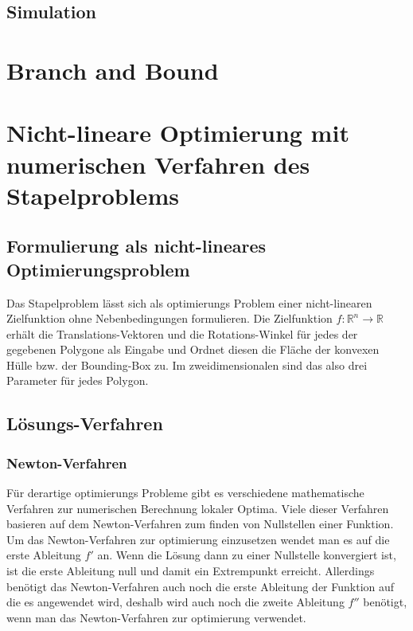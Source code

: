 \documentclass[runningheads,a4paper]{llncs}
\begin{document}
\subsection{Simulation}

\section{Branch and Bound}

\section{Nicht-lineare Optimierung mit numerischen Verfahren des Stapelproblems}

\subsection{Formulierung als nicht-lineares Optimierungsproblem}
\label{formObjStacking}
Das Stapelproblem lässt sich als optimierungs Problem einer nicht-linearen Zielfunktion ohne Nebenbedingungen formulieren. Die Zielfunktion $f: \mathbb{R}^n \rightarrow \mathbb{R}$ erhält die Translations-Vektoren und die Rotations-Winkel für jedes der gegebenen Polygone als Eingabe und Ordnet diesen die Fläche der konvexen Hülle bzw. der Bounding-Box zu. Im zweidimensionalen sind das also drei Parameter für jedes Polygon.

\subsection{Lösungs-Verfahren}

\subsubsection{Newton-Verfahren}

Für derartige optimierungs Probleme gibt es verschiedene mathematische Verfahren zur numerischen Berechnung lokaler Optima. Viele dieser Verfahren basieren auf dem Newton-Verfahren zum finden von Nullstellen einer Funktion. Um das Newton-Verfahren zur optimierung einzusetzen wendet man es auf die erste Ableitung $f'$ an. Wenn die Lösung dann zu einer Nullstelle konvergiert ist, ist die erste Ableitung null und damit ein Extrempunkt erreicht. Allerdings benötigt das Newton-Verfahren auch noch die erste Ableitung der Funktion auf die es angewendet wird, deshalb wird auch noch die zweite Ableitung $f''$ benötigt, wenn man das Newton-Verfahren zur optimierung verwendet.
\end{document}
